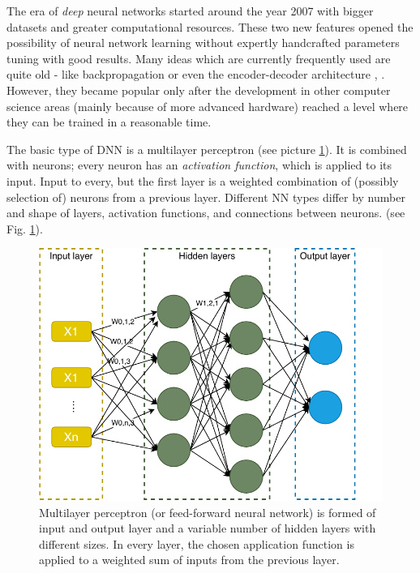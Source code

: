 The era of \textit{deep} neural networks started around the year 2007 \citep{Goodfellow-et-al-2016} with bigger datasets and greater computational resources. These two new features opened the possibility of neural network learning without expertly handcrafted parameters tuning with good results.
Many ideas which are currently frequently used are quite old - like backpropagation \citep{Rumelhart} or even the encoder-decoder architecture \citep{Allen19}, \citep{Forcada1997}. However, they became popular only after the development in other computer science areas (mainly because of more advanced hardware) reached a level where they can be trained in a reasonable time.
\par
The basic type of DNN is a multilayer perceptron (see picture \ref{pic:multilayer}).
It is combined with neurons; every neuron has an \textit{activation function}, which is applied to its input. Input to every, but the first layer is a weighted combination of (possibly selection of) neurons from a previous layer. 
Different NN types differ by number and shape of layers, activation functions, and connections between neurons. (see Fig. \ref{pic:multilayer}).
\begin{figure}[ht]
\centering
\includegraphics[width=1\columnwidth]{../img/multilayer}
\caption{Multilayer perceptron (or feed-forward neural network) is formed of input and output layer and a variable number of hidden layers with different sizes. In every layer, the chosen application function is applied to a weighted sum of inputs from the previous layer.}
\label{pic:multilayer}
\end{figure}
\par
